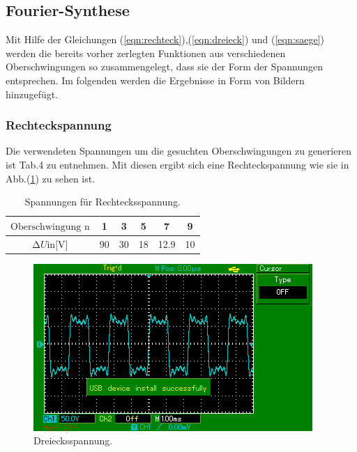 \subsection{Fourier-Synthese}
Mit Hilfe der Gleichungen (\ref{eqn:rechteck}),(\ref{eqn:dreieck}) und (\ref{eqn:saege})
werden die bereits vorher zerlegten Funktionen aus verschiedenen Oberschwingungen so zusammengelegt,
dass sie der Form der Spannungen entsprechen. Im folgenden werden die Ergebnisse in Form von Bildern hinzugefügt.

\subsubsection{Rechteckspannung}
Die verwendeten Spannungen um die gesuchten Oberschwingungen zu generieren ist Tab.4 zu entnehmen.
Mit diesen ergibt sich eine Rechteckspannung wie sie in Abb.(\ref{fig:recht}) zu sehen ist.
\begin{table}[h]
  \centering
  \label{tab:4}
  \begin{tabular}{ c c c c c c  }
    \toprule
   $ \text{Oberschwingung n} $ & 1 & 3 & 5 & 7 & 9 \\
    \midrule
   $\increment{U} \text{in[V]}$ &90 & 30 &18 &12.9 & 10 \\
    \bottomrule
  \end{tabular}
  \caption{Spannungen für Rechtecksspannung.}
\end{table}
\begin{figure}[H]
  \centering
  \includegraphics{content/images/rechteck.png}
  \caption{Dreiecksspannung.}
  \label{fig:recht}
\end{figure}
